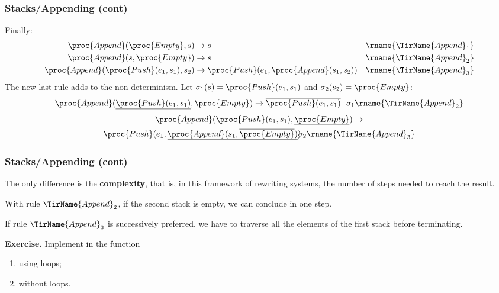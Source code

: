 %
\begin{frame}
\frametitle{Stacks/Appending (cont)}

Finally:
\begin{align*}
  \proc{Append} (\proc{Empty}, s) 
& \rightarrow s 
& \rname{\TirName{Append}_1}\\
  \proc{Append} (s, \proc{Empty})
& \rightarrow s
& \rname{\TirName{Append}_2}\\
  \proc{Append} (\proc{Push} (e_1, s_1), s_2) 
& \rightarrow \proc{Push} (e_1, \proc{Append} (s_1, s_2))
& \rname{\TirName{Append}_3}
\end{align*}
The new last rule adds to the non-determinism. Let
\(\sigma_1(s) = \proc{Push} (e_1, s_1)\) and \(\sigma_2(s_2) =
\proc{Empty}\):
\begin{align*}
\proc{Append} (\underline{\proc{Push} (e_1, s_1)}, \proc{Empty}) 
& \rightarrow \overline{\proc{Push} (e_1, s_1)}
& \!\!\sigma_1\rname{\TirName{Append}_2}
\end{align*}
\begin{multline*}
\proc{Append} (\proc{Push} (e_1, s_1), \underline{\proc{Empty}}) 
 \rightarrow\\
\proc{Push} (e_1, \underline{\proc{Append} (s_1,\overline{\proc{Empty}})}) 
 \!\!\sigma_2\rname{\TirName{Append}_3}
\end{multline*}

\end{frame}

%
\begin{frame}
\frametitle{Stacks/Appending (cont)}

The only difference is the \textbf{complexity}, that is, in this
framework of rewriting systems, the number of steps needed to reach
the result. 

\bigskip

With rule \(\TirName{Append}_2\), if the second stack is empty,
we can conclude in one step. 

\bigskip

If rule \(\TirName{Append}_3\) is successively preferred, we have to
traverse all the elements of the first stack before terminating.

\bigskip

\textbf{Exercise.} Implement in \C the  function
\begin{enumerate}

  \item using loops;

  \item without loops.

\end{enumerate}

\end{frame}
